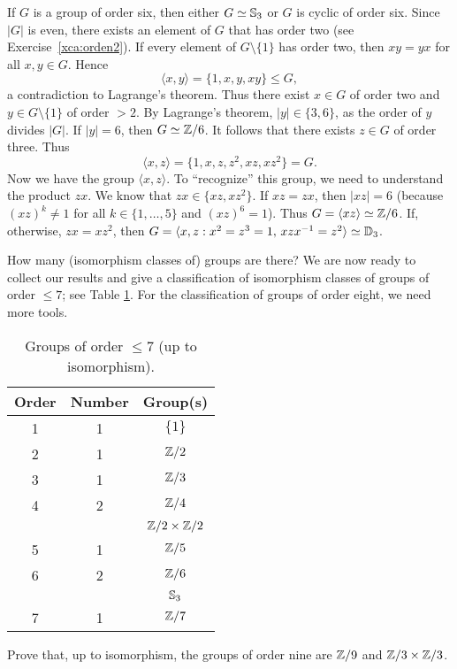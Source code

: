 \begin{example}
If $G$ is a group of order six, then
either $G\simeq\mathbb{S}_3$ or $G$ is cyclic of order six. 
Since $|G|$ is even, there exists an element of $G$ 
that has order two (see Exercise~\ref{xca:orden2}). 
If every element of $G\setminus\{1\}$ has order two, then
$xy=yx$ for all $x,y\in G$. Hence 
\[
\langle x,y\rangle=\{1,x,y,xy\}\leq G,
\]
a contradiction to Lagrange's theorem. Thus there exist 
$x\in G$ of order two 
and $y\in G\setminus\{1\}$ of order $>2$. 
By Lagrange's theorem, $|y|\in\{3,6\}$, 
as the order of $y$ divides $|G|$. If 
$|y|=6$, 
then $G\simeq\mathbb{Z}/6$. It follows that there exists 
$z\in G$ of order three. Thus 
\[
\langle x,z\rangle=\{1,x,z,z^2,xz,xz^2\}=G.
\]
Now we have the group $\langle x,z\rangle$. To ``recognize'' this group,
we need to understand the product $zx$. We know that
$zx\in\{xz,xz^2\}$. If $xz=zx$, then $|xz|=6$ (because
$(xz)^k\ne1$ for all $k\in\{1,\dots,5\}$ and
$(xz)^6=1$). Thus 
$G=\langle xz\rangle\simeq\mathbb{Z}/6$. If, otherwise, 
$zx=xz^2$, then 
$G=\langle x,z:x^2=z^3=1,\,xzx^{-1}=z^2\rangle\simeq\mathbb{D}_3$.
\end{example}

How many (isomorphism classes of) groups are there? We are now 
ready to collect our results and give a classification 
of isomorphism classes of groups of order $\leq7$; see
Table \ref{tab:grupos<8}. For the classification of groups
of order eight, we need more tools. 

\begin{table}[ht]
    \begin{tabular}{|c|c|c|}
    \hline
    Order & Number & Group(s)\\
    \hline
        1 & 1 & $\{1\}$ \\
        2 & 1 & $\mathbb{Z}/2$ \\
        3 & 1 & $\mathbb{Z}/3$ \\
        4 & 2 & $\mathbb{Z}/4$ \\
        && $\mathbb{Z}/2\times\mathbb{Z}/2$ \\
        5 & 1 & $\mathbb{Z}/5$ \\
        6 & 2 & $\mathbb{Z}/6$\\
        &&$\mathbb{S}_3$ \\
        7 & 1 & $\mathbb{Z}/7$ \\
    \hline
    \end{tabular}
    \caption{Groups of order $\leq7$ (up to isomorphism).}
    \label{tab:grupos<8}
\end{table}

\begin{exercise}
\label{xca:size9}
Prove that, up to isomorphism, the groups of order nine are 
$\mathbb{Z}/9$ and $\mathbb{Z}/3\times\mathbb{Z}/3$.
\end{exercise}

